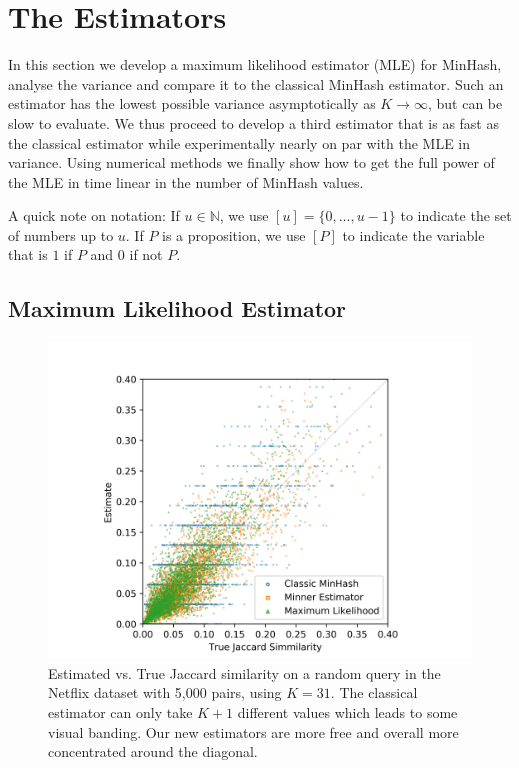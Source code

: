 
\section{The Estimators}

In this section we develop a maximum likelihood estimator (MLE) for MinHash, analyse the variance and compare it to the classical MinHash estimator.
Such an estimator has the lowest possible variance asymptotically as $K\to\infty$, but can be slow to evaluate.
We thus proceed to develop a third estimator that is as fast as the classical estimator while experimentally nearly on par with the MLE in variance.
Using numerical methods we finally show how to get the full power of the MLE in time linear in the number of MinHash values.

A quick note on notation: If $u\in\mathbb N$, we use $[u]=\{0,\dots,u-1\}$ to indicate the set of numbers up to $u$.
If $P$ is a proposition, we use $[P]$ to indicate the variable that is $1$ if $P$ and $0$ if not $P$.

\subsection{Maximum Likelihood Estimator}\label{sec:mle}

\begin{figure}
   \centering
   \includegraphics[trim=30 5 30 35,clip,width=\linewidth]{figures/scatter}
   \caption{
      Estimated vs. True Jaccard similarity on a random query in the Netflix dataset with 5,000 pairs, using $K=31$.
      The classical estimator can only take $K+1$ different values which leads to some visual banding.
      Our new estimators are more free and overall more concentrated around the diagonal.
   }
   \label{fig:scatter}
\end{figure}

